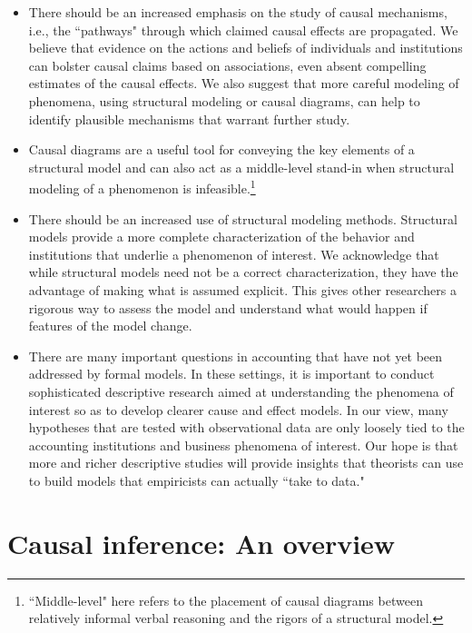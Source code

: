 \documentclass[12pt,reqno,titlepage]{amsart}
\theoremstyle{definition}
\begin{document}
\begin{doublespace}
\begin{itemize}
\item There should be an increased emphasis on the study of causal mechanisms, i.e., the ``pathways" through which claimed causal effects are propagated.
We believe that evidence on the actions and beliefs of individuals and institutions can bolster causal claims based on associations, even absent compelling estimates of the causal effects.
We also suggest that more careful modeling of phenomena, using structural modeling or causal diagrams, can help to identify plausible mechanisms that warrant further study.
\item Causal diagrams are a useful tool for conveying the key elements of a structural model and can also act as a middle-level stand-in when structural modeling of a phenomenon is infeasible.\footnote{``Middle-level" here refers to the placement of causal diagrams between relatively informal verbal reasoning and the rigors of a structural model.}
\item There should be an increased use of structural modeling methods. 
Structural models provide a more complete characterization of the behavior and institutions that underlie a phenomenon of interest.
We acknowledge that while structural models need not be a correct
characterization, they have the advantage of making what is assumed explicit. This gives other researchers a rigorous way to assess the model and understand what would happen if features of the model change.

\item There are many important questions in accounting that have not yet been addressed by formal models.
	In these settings, it is important to conduct sophisticated descriptive research aimed at understanding the phenomena of interest so as to develop clearer cause and effect models.
	In our view, many hypotheses that are tested with observational data are only loosely tied to the accounting institutions and business phenomena of interest. 
	Our hope is that more and richer descriptive studies will provide insights that theorists can use to build models that empiricists can actually ``take to data."





\end{itemize}

\section{Causal inference: An overview} \label{sec:causal}


\end{doublespace}
\end{document}
